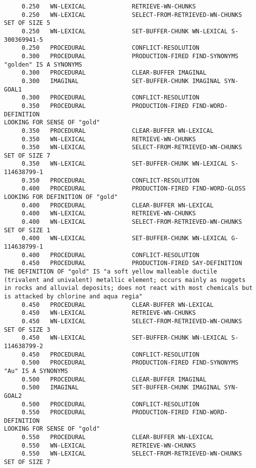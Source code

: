 \begin{verbatim}
     0.250   WN-LEXICAL             RETRIEVE-WN-CHUNKS 
     0.250   WN-LEXICAL             SELECT-FROM-RETRIEVED-WN-CHUNKS SET OF SIZE 5 
     0.250   WN-LEXICAL             SET-BUFFER-CHUNK WN-LEXICAL S-300369941-5 
     0.250   PROCEDURAL             CONFLICT-RESOLUTION 
     0.300   PROCEDURAL             PRODUCTION-FIRED FIND-SYNONYMS 
"golden" IS A SYNONYMS 
     0.300   PROCEDURAL             CLEAR-BUFFER IMAGINAL 
     0.300   IMAGINAL               SET-BUFFER-CHUNK IMAGINAL SYN-GOAL1 
     0.300   PROCEDURAL             CONFLICT-RESOLUTION 
     0.350   PROCEDURAL             PRODUCTION-FIRED FIND-WORD-DEFINITION 
LOOKING FOR SENSE OF "gold" 
     0.350   PROCEDURAL             CLEAR-BUFFER WN-LEXICAL 
     0.350   WN-LEXICAL             RETRIEVE-WN-CHUNKS 
     0.350   WN-LEXICAL             SELECT-FROM-RETRIEVED-WN-CHUNKS SET OF SIZE 7 
     0.350   WN-LEXICAL             SET-BUFFER-CHUNK WN-LEXICAL S-114638799-1 
     0.350   PROCEDURAL             CONFLICT-RESOLUTION 
     0.400   PROCEDURAL             PRODUCTION-FIRED FIND-WORD-GLOSS 
LOOKING FOR DEFINITION OF "gold" 
     0.400   PROCEDURAL             CLEAR-BUFFER WN-LEXICAL 
     0.400   WN-LEXICAL             RETRIEVE-WN-CHUNKS 
     0.400   WN-LEXICAL             SELECT-FROM-RETRIEVED-WN-CHUNKS SET OF SIZE 1 
     0.400   WN-LEXICAL             SET-BUFFER-CHUNK WN-LEXICAL G-114638799-1 
     0.400   PROCEDURAL             CONFLICT-RESOLUTION 
     0.450   PROCEDURAL             PRODUCTION-FIRED SAY-DEFINITION 
THE DEFINITION OF "gold" IS "a soft yellow malleable ductile (trivalent and univalent) metallic element; occurs mainly as nuggets in rocks and alluvial deposits; does not react with most chemicals but is attacked by chlorine and aqua regia" 
     0.450   PROCEDURAL             CLEAR-BUFFER WN-LEXICAL 
     0.450   WN-LEXICAL             RETRIEVE-WN-CHUNKS 
     0.450   WN-LEXICAL             SELECT-FROM-RETRIEVED-WN-CHUNKS SET OF SIZE 3 
     0.450   WN-LEXICAL             SET-BUFFER-CHUNK WN-LEXICAL S-114638799-2 
     0.450   PROCEDURAL             CONFLICT-RESOLUTION 
     0.500   PROCEDURAL             PRODUCTION-FIRED FIND-SYNONYMS 
"Au" IS A SYNONYMS 
     0.500   PROCEDURAL             CLEAR-BUFFER IMAGINAL 
     0.500   IMAGINAL               SET-BUFFER-CHUNK IMAGINAL SYN-GOAL2 
     0.500   PROCEDURAL             CONFLICT-RESOLUTION 
     0.550   PROCEDURAL             PRODUCTION-FIRED FIND-WORD-DEFINITION 
LOOKING FOR SENSE OF "gold" 
     0.550   PROCEDURAL             CLEAR-BUFFER WN-LEXICAL 
     0.550   WN-LEXICAL             RETRIEVE-WN-CHUNKS 
     0.550   WN-LEXICAL             SELECT-FROM-RETRIEVED-WN-CHUNKS SET OF SIZE 7 

\end{verbatim}
